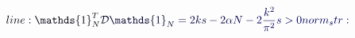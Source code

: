 \documentclass[12pt]{article}
\begin{document}
\makeatletter
\renewcommand*{\@textcolor}[3]{%
  \protect\leavevmode
  \begingroup
    \color#1{#2}#3%
  \endgroup
}
\makeatother
\begin{displaymath}
\mathcolor[RGB]{0,0,15}{line:
\mathds{1}_N^T} \mathcolor[RGB]{0,0,30}{\mathcal{D}} \mathcolor[RGB]{0,0,45}{\mathds{1}_N=} \mathcolor[RGB]{0,0,60}{2ks-2\alpha} \mathcolor[RGB]{0,0,75}{N-} \mathcolor[RGB]{0,0,90}{2\frac{k^2}{\pi^2}s>0

norm_str:}
\end{displaymath}
\end{document}
